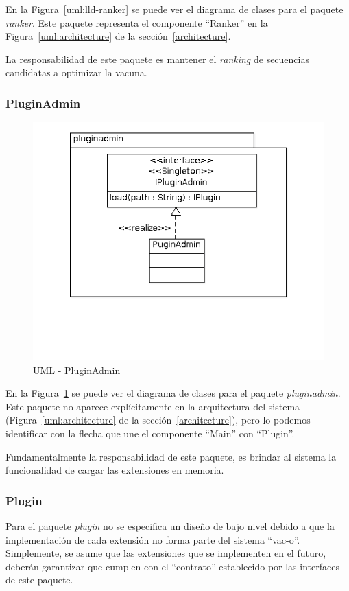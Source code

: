   En la Figura~\ref{uml:lld-ranker} se puede ver el diagrama de clases
para el paquete \textit{ranker}. Este paquete representa el componente
``Ranker'' en la Figura~\ref{uml:architecture} de la
secci\'on~\ref{architecture}.

  La responsabilidad de este paquete es mantener el \textit{ranking} de
secuencias candidatas a optimizar la vacuna.

  \subsubsection{PluginAdmin}
  \begin{figure}
      \centering
      \includegraphics[scale=0.5]{lld-pluginadmin.png}  
      \caption{UML - PluginAdmin}
      \label{uml:lld-pluginadmin}
    \end{figure}

  En la Figura~\ref{uml:lld-pluginadmin} se puede ver el diagrama de clases
para el paquete \textit{pluginadmin}. Este paquete no aparece expl\'icitamente
en la arquitectura del sistema (Figura~\ref{uml:architecture} de la
secci\'on~\ref{architecture}), pero lo podemos identificar con la flecha que une
el componente ``Main'' con ``Plugin''.

  Fundamentalmente la responsabilidad de este paquete, es brindar al sistema la
funcionalidad de cargar las extensiones en memoria.

  \subsubsection{Plugin}
  Para el paquete \textit{plugin} no se especifica un dise\~no de bajo nivel
debido a que la implementaci\'on de cada extensi\'on no forma parte del sistema
``vac-o''. Simplemente, se asume que las extensiones que se implementen en el
futuro, deber\'an garantizar que cumplen con el ``contrato'' establecido por
las interfaces de este paquete.
